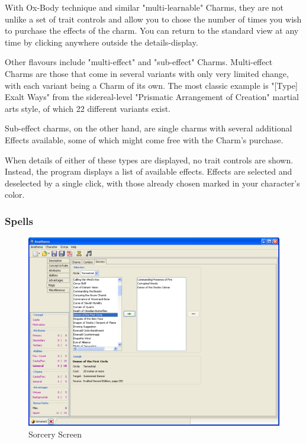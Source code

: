 With Ox-Body technique and similar "multi-learnable" Charms, they are not unlike a set of trait controls and allow you to chose the number of times you wish to purchase the effects of the charm. You can return to the standard view at any time by clicking anywhere outside the details-display.

Other flavours include "multi-effect" and "sub-effect" Charms. Multi-effect Charms are those that come in several variants with only very limited change, with each variant being a Charm of its own. The most classic example is "[Type] Exalt Ways" from the sidereal-level "Prismatic Arrangement of Creation" martial arts style, of which 22 different variants exist.

Sub-effect charms, on the other hand, are single charms with several additional Effects available, some of which might come free with the Charm's purchase.

When details of either of these types are displayed, no trait controls are shown. Instead, the program displays a list of available effects. Effects are selected and deselected by a single click, with those already chosen marked in your character's color.

\subsubsection{Spells}
\begin{figure}
	\centering
		\includegraphics[width=1.00\textwidth]{images/Spells.png}
	\caption{Sorcery Screen}
	\label{fig:Spells}
\end{figure}

